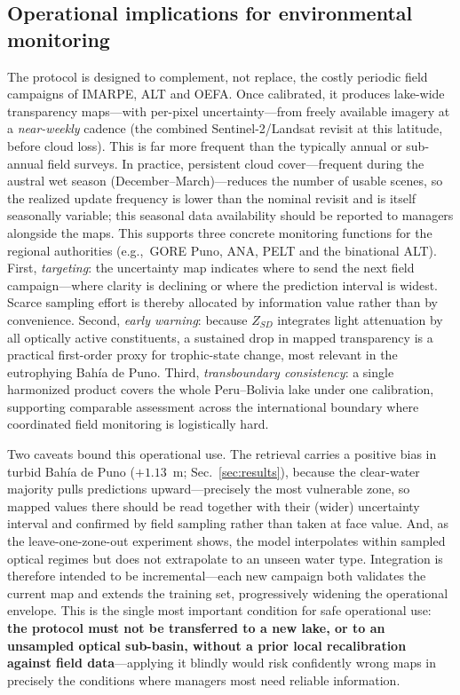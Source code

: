 \documentclass[pdflatex,sn-basic]{sn-jnl}
\begin{document}
\subsection{Operational implications for environmental monitoring}
The protocol is designed to complement, not replace, the costly periodic field
campaigns of IMARPE, ALT and OEFA. Once calibrated, it produces lake-wide
transparency maps---with per-pixel uncertainty---from freely available imagery at a
\emph{near-weekly} cadence (the combined Sentinel-2/Landsat revisit at this
latitude, before cloud loss). This is far more frequent than the typically annual or
sub-annual field surveys. In practice, persistent cloud cover---frequent during the austral
wet season (December--March)---reduces the number of usable scenes, so the realized
update frequency is lower than the nominal revisit and is itself seasonally
variable; this seasonal data availability should be reported to managers alongside
the maps. This supports three concrete monitoring functions for the regional
authorities (e.g.,\ GORE Puno, ANA, PELT and the binational ALT). First,
\emph{targeting}: the uncertainty map indicates where to send the next field
campaign---where clarity is declining or where the prediction interval is widest.
Scarce sampling effort is thereby allocated by information value rather than by
convenience. Second, \emph{early warning}: because $Z_{SD}$ integrates light
attenuation by all optically active constituents, a sustained drop in mapped
transparency is a practical first-order proxy for trophic-state change, most
relevant in the eutrophying Bah\'ia de Puno. Third, \emph{transboundary
consistency}: a single harmonized product covers the whole Peru--Bolivia lake under
one calibration, supporting comparable assessment across the international boundary
where coordinated field monitoring is logistically hard.

Two caveats bound this operational use. The retrieval carries a positive bias in
turbid Bah\'ia de Puno ($+1.13$~m; Sec.~\ref{sec:results}), because the
clear-water majority pulls predictions upward---precisely the most vulnerable zone,
so mapped values there should be read together with their (wider) uncertainty
interval and confirmed by field sampling rather than taken at face value. And, as
the leave-one-zone-out experiment shows, the model interpolates within sampled
optical regimes but does not extrapolate to an unseen water type. Integration is
therefore intended to be incremental---each new campaign both validates the current
map and extends the training set, progressively widening the operational envelope.
This is the single most important condition for safe operational use:
\textbf{the protocol must not be transferred to a new lake, or to an unsampled
optical sub-basin, without a prior local recalibration against field
data}---applying it blindly would risk confidently wrong maps in precisely the
conditions where managers most need reliable information.
\end{document}
